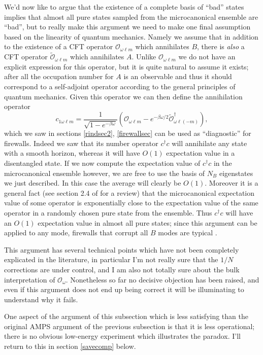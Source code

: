 \documentclass[12pt]{article}
\newcommand{\be}{\begin{equation}}
\newcommand{\ee}{\end{equation}}
\newcommand{\mO}{\mathcal{O}}
\newcommand{\tO}{\widetilde{\mathcal{O}}}
\begin{document}
We'd now like to argue that the existence of a complete basis of ``bad'' states implies that almost all pure states sampled from the microcanonical ensemble are ``bad'', but to really make this argument we need to make one final assumption based on the linearity of quantum mechanics.  Namely we assume that in addition to the existence of a CFT operator $\mO_{\omega \ell m}$ which annihilates $B$, there is \textit{also} a CFT operator $\tO_{\omega \ell m}$ which annihilates $A$.  Unlike $\mO_{\omega \ell m}$ we do not have an explicit expression for this operator, but it is quite natural to assume it exists; after all the occupation number for $A$ is an observable and thus it should correspond to a self-adjoint operator according to the general principles of quantum mechanics.  Given this operator we can then define the annihilation operator
\be
c_{1\omega \ell m}=\frac{1}{\sqrt{1-e^{-\beta\omega}}}\left(\mO_{\omega \ell m}-e^{-\beta\omega/2}\tO_{\omega\ell (-m)}^\dagger\right),
\ee
which we saw in sections \ref{rindsec2}, \ref{firewallsec} can be used as ``diagnostic'' for firewalls.  Indeed we saw that its number operator $c^\dagger c$ will annihilate any state with a smooth horizon, whereas it will have $O(1)$ expectation value in a disentangled state.  If we now compute the expectation value of $c^\dagger c$ in the microcanonical ensemble however, we are free to use the basis of $N_B$ eigenstates we just described.  In this case the average will clearly be $O(1)$.  Moreover it is a general fact (see section 2.4 of \cite{Harlow:2014yoa} for a review) that the microcanonical expectation value of some operator is exponentially close to the expectation value of the same operator in a randomly chosen pure state from the ensemble.  Thus $c^\dagger c$ will have an $O(1)$ expectation value in almost all pure states; since this argument can be applied to any mode, firewalls that corrupt all $B$ modes are typical \cite{Marolf:2013dba}.  

This argument has several technical points which have not been completely explicated in the literature, in particular I'm not really sure that the $1/N$ corrections are under control, and I am also not totally sure about the bulk interpretation of $\mO_\omega$.  Nonetheless so far no decisive objection has been raised, and even if this argument does not end up being correct it will be illuminating to understand why it fails.  

One aspect of the argument of this subsection which is less satisfying than the original AMPS argument of the previous subsection is that it is less operational; there is no obvious low-energy experiment which illustrates the paradox.  I'll return to this in section \ref{savecomp} below.
\end{document}
